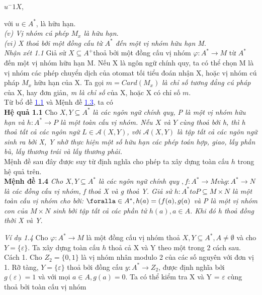 $u^-1X$,
\begin{flushleft}
\hspace{20mm} với $u \in A^*$, là hữu hạn.\\
\hspace{10mm}\textit{($v$)    Vị nhóm cú phép $M_x$ là hữu hạn}.\\
\hspace{10mm}\textit{($vi$)   X thoả bởi một đồng cấu từ $A^*$ đến một vị nhóm hữu hạn M}.\\
\textit{Nhận xét 1.1}   Giả sử $X \subseteq A^+ $thoả bởi một đồng cấu vị nhóm $\varphi : A^* \to M$ từ $A^*$ đến một vị nhóm hữu hạn M. Nếu X là ngôn ngữ chính quy, ta có thể chọn M là vị nhóm các phép chuyển dịch của otomat tối tiểu đoán nhận X, hoặc vị nhóm cú pháp $M_x$ hữu hạn của X. Ta gọi $m = Card(M_x)$ \textit{là chỉ số tương đẳng cú pháp} của X, hay đơn giản, \textit{m là chỉ số} của X, hoặc X có chỉ số $m$.\\
\hspace{10mm}Từ bổ đề \hyperlink{page.17}{\textcolor{blue}{1.1}} và Mệnh đề \hyperlink{page.17}{\textcolor{blue}{1.3}}, ta có \\
\textbf{Hệ quả 1.1} Cho $X, Y \subseteq A^*$ \textit{là các ngôn ngữ chính quy, P là một vị nhóm hữu hạn và $h : A^* \to P$ là một toàn cấu vị nhóm. Nếu $X$ và $Y$ cùng thoả bởi h, thì h thoả tất cả các ngôn ngữ $L \in \mathcal{A}(X, Y)$, với $\mathcal{A}(X, Y)$ là tập tất cả các ngôn ngữ sinh ra bởi X, Y nhờ thực hiện một số hữu hạn các phép toán hợp, giao, lấy phần bù, lấy thương trái và lấy thương phải.}\\
\hspace{10mm} Mệnh đề sau đây được suy từ định nghĩa cho phép ta xây dựng toàn cấu $h$ trong hệ quả trên.\\
\textbf{Mệnh đề 1.4}    \textit{Cho $X, Y \subseteq A^*$ là các ngôn ngữ chính quy $, f : A^* \to M và g : A^* \to N $ là các đồng cấu vị nhóm, f thoả X và g thoả Y. Giả sử $h : A^*to P \subseteq M \times N$ là một toàn cấu vị nhóm cho bởi: $\foralla \in A^*, h(a) = (f(a),g(a)$ và P là một vị nhóm con của $M \times N$ sinh bởi tập tất cả các phần tử $h(a), a \in A$. Khi đó h thoả đồng thời X và Y}.\\
\begin{flushleft}
\textit{Ví dụ 1.4}  Cho $\varphi : A^* \to M$ là một đồng cấu vị nhóm thoả $X, Y \subseteq A^*, A \ne \emptyset$ và cho $Y = \{ \varepsilon \}$. Ta xây dựng toàn cấu $h$ thoả cả X và Y theo một trong 2 cách sau.
\hspace{10mm}Cách 1. Cho $Z_2 = \{ 0,1 \}$ là vị nhóm nhân modulo 2 của các số nguyên với đơn vị 1. Rỡ tàng, $Y = \{ \varepsilon \}$ thoả bởi đồng cấu $y : A^* \to Z_2$, được định nghĩa bởi $g(\varepsilon) = 1$ và với mọi $a \in A, g(a) = 0$. Ta có thể kiểm tra X và Y = {$\varepsilon$} cùng thoả bởi toàn cấu vị nhóm 
\end{flushleft}
\end{flushleft}

